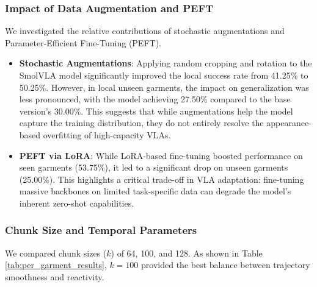 \subsubsection{Impact of Data Augmentation and PEFT}
\label{sec:ablation_aug}
We investigated the relative contributions of stochastic augmentations and Parameter-Efficient Fine-Tuning (PEFT). 
\begin{itemize}[leftmargin=*,noitemsep]
    \item \textbf{Stochastic Augmentations}: Applying random cropping and rotation to the SmolVLA model significantly improved the local success rate from 41.25\% to 50.25\%. However, in local unseen garments, the impact on generalization was less pronounced, with the model achieving 27.50\% compared to the base version's 30.00\%. This suggests that while augmentations help the model capture the training distribution, they do not entirely resolve the appearance-based overfitting of high-capacity VLAs.
    \item \textbf{PEFT via LoRA}: While LoRA-based fine-tuning boosted performance on seen garments (53.75\%), it led to a significant drop on unseen garments (25.00\%). This highlights a critical trade-off in VLA adaptation: fine-tuning massive backbones on limited task-specific data can degrade the model's inherent zero-shot capabilities.
\end{itemize}

\subsubsection{Chunk Size and Temporal Parameters}
We compared chunk sizes ($k$) of 64, 100, and 128. As shown in Table \ref{tab:per_garment_results}, $k=100$ provided the best balance between trajectory smoothness and reactivity. 

